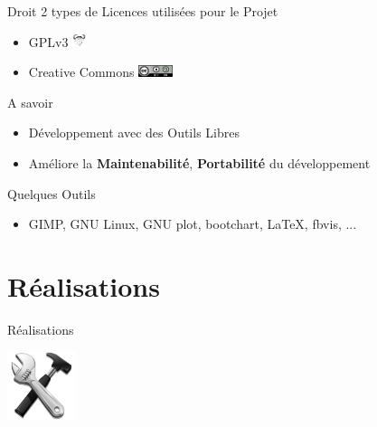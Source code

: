 \documentclass[11pt]{beamer}
\begin{document}
	\begin{frame}{Droit}
	2 types de Licences utilisées pour le Projet
	\begin{itemize}
		\item GPLv3 \includegraphics[width=0.4cm]{common/gnu.png}	\\
		\href{http://www.tldrlegal.com/license/gnu-general-public-license-v3-(gpl-3)}{}
		
	\end{itemize}
	\begin{itemize}
		\item Creative Commons 	\includegraphics[width=1cm]{common/cc.png}\\
		\href{http://creativecommons.org/licenses/by-sa/4.0/}{}

	\end{itemize}
	\begin{block}{A savoir}
			\begin{itemize}
			\item Développement avec des Outils Libres
			\item Améliore la \textbf{Maintenabilité}, \textbf{Portabilité} du développement
		\end{itemize}
		\end{block}
	
		\begin{block}{Quelques Outils}
			\begin{itemize}
			\item GIMP, GNU Linux, GNU plot, bootchart, \LaTeX, fbvis, ...
		\end{itemize}
		\end{block}
	\end{frame}
	
	\section{Réalisations}
	
	\begin{frame}{Réalisations}
		
			\begin{center}
			\includegraphics[width=2cm]{common/Settings.png}	
	\end{center}
		
	\end{frame}
	
\end{document}
